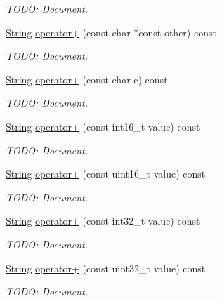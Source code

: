 \begin{DoxyCompactItemize}
\begin{DoxyCompactList}\small\item\em T\+O\+DO\+: Document. \end{DoxyCompactList}\item 
\hyperlink{class_power_1_1_string}{String} \hyperlink{class_power_1_1_string_af34ca6369790db392b8a39e2149e5201}{operator+} (const char $\ast$const other) const
\begin{DoxyCompactList}\small\item\em T\+O\+DO\+: Document. \end{DoxyCompactList}\item 
\hyperlink{class_power_1_1_string}{String} \hyperlink{class_power_1_1_string_ada2da9028cb2a4ebffc585a1da8a942f}{operator+} (const char c) const
\begin{DoxyCompactList}\small\item\em T\+O\+DO\+: Document. \end{DoxyCompactList}\item 
\hyperlink{class_power_1_1_string}{String} \hyperlink{class_power_1_1_string_ad650c3d76fd2ff718f2ee0dd6b9945de}{operator+} (const int16\+\_\+t value) const
\begin{DoxyCompactList}\small\item\em T\+O\+DO\+: Document. \end{DoxyCompactList}\item 
\hyperlink{class_power_1_1_string}{String} \hyperlink{class_power_1_1_string_a6efb41ecb5b26be77e91fba85a286538}{operator+} (const uint16\+\_\+t value) const
\begin{DoxyCompactList}\small\item\em T\+O\+DO\+: Document. \end{DoxyCompactList}\item 
\hyperlink{class_power_1_1_string}{String} \hyperlink{class_power_1_1_string_ac2eab190a121d5b7dc4431ea22966b7e}{operator+} (const int32\+\_\+t value) const
\begin{DoxyCompactList}\small\item\em T\+O\+DO\+: Document. \end{DoxyCompactList}\item 
\hyperlink{class_power_1_1_string}{String} \hyperlink{class_power_1_1_string_afc7e926554a6e77bd4e34e850f08fa35}{operator+} (const uint32\+\_\+t value) const
\begin{DoxyCompactList}\small\item\em T\+O\+DO\+: Document. \end{DoxyCompactList}\item 

\end{DoxyCompactItemize}
